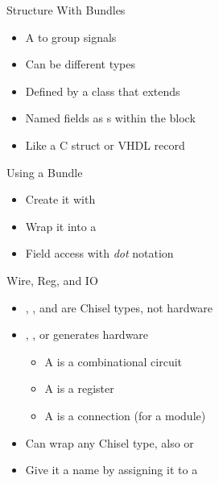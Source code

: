 \begin{frame}[fragile]{Structure With Bundles}
\begin{itemize}
\item A  to group signals
\item Can be different types
\item Defined by a class that extends 
\item Named fields as s within the block
\item Like a C struct or VHDL record
\end{itemize}
\end{frame}

\begin{frame}[fragile]{Using a Bundle}
\begin{itemize}
\item Create it with 
\item Wrap it into a 
\item Field access with \emph{dot} notation
\end{itemize}
\end{frame}

\begin{frame}[fragile]{Wire, Reg, and IO}
\begin{itemize}
\item {}, , and  are Chisel types, not hardware
\item {}, , or  generates hardware
\begin{itemize}
\item A  is a combinational circuit
\item A  is a register
\item A  is a connection (for a module)
\end{itemize}
\item Can wrap any Chisel type, also  or 
\item Give it a name by assigning it to a 
\end{itemize}
\end{frame}

